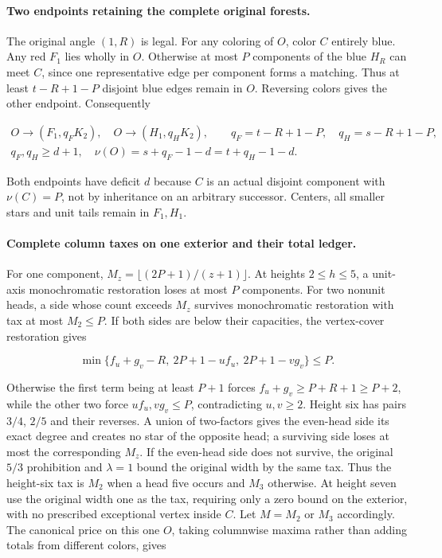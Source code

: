 \documentclass[11pt,a4paper]{article}
\theoremstyle{definition}
\begin{document}
\paragraph{Two endpoints retaining the complete original forests.}
The original angle $(1,R)$ is legal. For any coloring of $O$, color $C$ entirely blue. Any red $F_1$ lies wholly in $O$. Otherwise at most $P$ components of the blue $H_R$ can meet $C$, since one representative edge per component forms a matching. Thus at least $t-R+1-P$ disjoint blue edges remain in $O$. Reversing colors gives the other endpoint. Consequently

\begin{gather}
 O\to(F_1,q_FK_2),\quad O\to(H_1,q_HK_2),\qquad
 q_F=t-R+1-P,\quad q_H=s-R+1-P,\label{eq:D6-full-endpoints}\\
 q_F,q_H\ge d+1,\quad
 \nu(O)=s+q_F-1-d=t+q_H-1-d.\nonumber
\end{gather}

Both endpoints have deficit $d$ because $C$ is an actual disjoint component with $\nu(C)=P$, not by inheritance on an arbitrary successor. Centers, all smaller stars and unit tails remain in $F_1,H_1$.

\paragraph{Complete column taxes on one exterior and their total ledger.}
For one component, $M_z=\lfloor(2P+1)/(z+1)\rfloor$. At heights $2\le h\le5$, a unit-axis monochromatic restoration loses at most $P$ components. For two nonunit heads, a side whose count exceeds $M_z$ survives monochromatic restoration with tax at most $M_2\le P$. If both sides are below their capacities, the vertex-cover restoration gives

\[
 \min\{f_u+g_v-R,\ 2P+1-uf_u,\ 2P+1-vg_v\}\le P.
\]

Otherwise the first term being at least $P+1$ forces $f_u+g_v\ge P+R+1\ge P+2$, while the other two force $uf_u,vg_v\le P$, contradicting $u,v\ge2$. Height six has pairs $3/4$, $2/5$ and their reverses. A union of two-factors gives the even-head side its exact degree and creates no star of the opposite head; a surviving side loses at most the corresponding $M_z$. If the even-head side does not survive, the original $5/3$ prohibition and $\lambda=1$ bound the original width by the same tax. Thus the height-six tax is $M_2$ when a head five occurs and $M_3$ otherwise. At height seven use the original width one as the tax, requiring only a zero bound on the exterior, with no prescribed exceptional vertex inside $C$.
Let $M=M_2$ or $M_3$ accordingly. The canonical price on this one $O$, taking columnwise maxima rather than adding totals from different colors, gives
\end{document}
